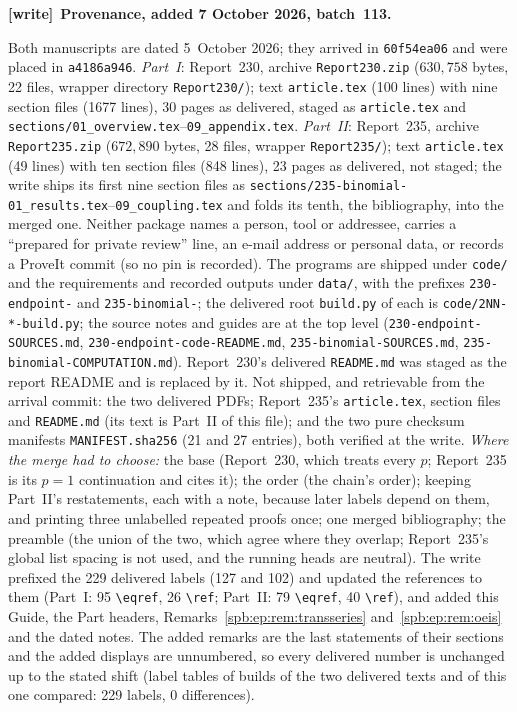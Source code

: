 \documentclass[11pt,letterpaper]{article}
\numberwithin{equation}{section}
\theoremstyle{definition}\newtheorem{definition}[theorem]{Definition}
\theoremstyle{remark}\newtheorem{remark}[theorem]{Remark}
\newcommand{\1}{\mathbf 1}
\newcommand{\file}[1]{\nolinkurl{#1}}
\newenvironment{writenote}[1][]{\par\smallskip\begingroup\small
 \noindent\textbf{[write]}\if\relax\detokenize{#1}\relax\else~\textbf{#1.}\fi\ }%
 {\par\endgroup\smallskip}
\begin{document}
\begin{writenote}[Provenance, added 7 October 2026, batch~113]\raggedright
Both manuscripts are dated 5~October 2026; they arrived in \file{60f54ea06} and
were placed in \file{a4186a946}. \emph{Part~I}: Report~230, archive
\file{Report230.zip} ($630{,}758$ bytes, 22 files, wrapper directory
\file{Report230/}); text \file{article.tex} (100 lines) with nine section files
(1677 lines), 30 pages as delivered, staged as \file{article.tex} and
\file{sections/01_overview.tex}--\file{09_appendix.tex}. \emph{Part~II}:
Report~235, archive \file{Report235.zip} ($672{,}890$ bytes, 28 files, wrapper
\file{Report235/}); text \file{article.tex} (49 lines) with ten section files
(848 lines), 23 pages as delivered, not staged; the write ships its first nine
section files as \file{sections/235-binomial-01_results.tex}--\file{09_coupling.tex}
and folds its tenth, the bibliography, into the merged one. Neither package
names a person, tool or addressee, carries a ``prepared for private review''
line, an e-mail address or personal data, or records a ProveIt commit (so no
pin is recorded). The programs are shipped under \file{code/} and the
requirements and recorded outputs under \file{data/}, with the prefixes
\file{230-endpoint-} and \file{235-binomial-}; the delivered root
\file{build.py} of each is \file{code/2NN-*-build.py}; the source notes and
guides are at the top level (\file{230-endpoint-SOURCES.md},
\file{230-endpoint-code-README.md}, \file{235-binomial-SOURCES.md},
\file{235-binomial-COMPUTATION.md}). Report~230's delivered \file{README.md}
was staged as the report README and is replaced by it. Not shipped, and
retrievable from the arrival commit: the two delivered PDFs; Report~235's
\file{article.tex}, section files and \file{README.md} (its text is Part~II of
this file); and the two pure checksum manifests \file{MANIFEST.sha256} (21 and
27 entries), both verified at the write. \emph{Where the merge had to choose:}
the base (Report~230, which treats every $p$; Report~235 is its $p=1$
continuation and cites it); the order (the chain's order); keeping Part~II's
restatements, each with a note, because later labels depend on them, and
printing three unlabelled repeated proofs once; one merged bibliography; the
preamble (the union of the two, which agree where they overlap; Report~235's
global list spacing is not used, and the running heads are
neutral). The write prefixed the
229 delivered labels (127 and 102) and updated the references to them (Part~I:
95 \verb|\eqref|, 26 \verb|\ref|; Part~II: 79 \verb|\eqref|, 40 \verb|\ref|), and added this Guide, the Part headers,
Remarks~\ref{spb:ep:rem:transseries} and~\ref{spb:ep:rem:oeis} and the dated
notes. The added remarks are the last statements of their sections and the
added displays are unnumbered, so every delivered number is unchanged up to the
stated shift (label tables of builds of the two delivered texts and of this one
compared: 229 labels, 0 differences).


\end{writenote}
\end{document}
